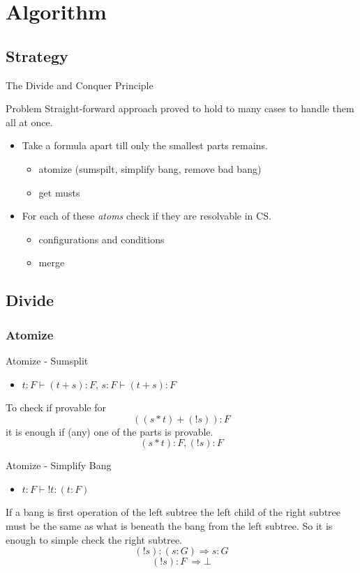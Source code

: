 \documentclass{beamer}
\begin{document}
\section{Algorithm}
\subsection{Strategy}
\begin{frame}{The Divide and Conquer Principle}
	\begin{block}{Problem}
	Straight-forward approach proved to hold to many cases to handle them all at once.
	\end{block}
	\begin{itemize}
	\item[divide]Take a formula apart till only the smallest parts remains.
		\begin{itemize} 
		\item atomize (sumspilt, simplify bang, remove bad bang) 
		\item get musts
		\end{itemize}
	\item[conquer]For each of these \textit{atoms} check if they are resolvable in CS.
		\begin{itemize}
		\item configurations and conditions
		\item merge
		\end{itemize}
	\end{itemize}	 
\end{frame}

\subsection{Divide}
\subsubsection{Atomize}
\begin{frame}{Atomize - Sumsplit}
	\begin{block}{}
	\begin{itemize}
		\item[C2]$t:F \vdash (t+s):F$, $s:F \vdash (t+s):F$
	\end{itemize}
	To check if provable for
	\[((s*t)+(!s)):F\]
	it is enough if (any) one of the parts is provable.
	\[(s*t):F, (!s):F\]
	\end{block}	
\end{frame}

\begin{frame}{Atomize - Simplify Bang}
	\begin{block}{}
	\begin{itemize}
		\item[C3]$t:F \vdash !t:(t:F)$
	\end{itemize}
	If a bang is first operation of the left subtree the left child of the right subtree must be the same as what is beneath the bang from the left subtree. So it is enough to simple check the right subtree.
		\[(!s):(s:G) \Rightarrow s:G\]
		\[(!s):F\ \Rightarrow \bot\]
	\end{block}
\end{frame}
\end{document}
